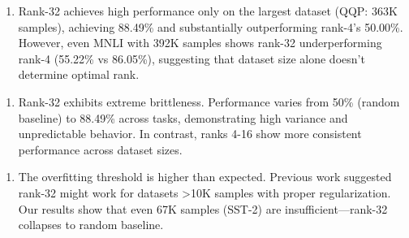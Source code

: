 \begin{enumerate}
\item Rank-32 achieves high performance only on the largest dataset (QQP: 363K samples), achieving 88.49\% and substantially outperforming rank-4's 50.00\%. However, even MNLI with 392K samples shows rank-32 underperforming rank-4 (55.22\% vs 86.05\%), suggesting that dataset size alone doesn't determine optimal rank.
\end{enumerate}

\begin{enumerate}
\item Rank-32 exhibits extreme brittleness. Performance varies from 50\% (random baseline) to 88.49\% across tasks, demonstrating high variance and unpredictable behavior. In contrast, ranks 4-16 show more consistent performance across dataset sizes.
\end{enumerate}

\begin{enumerate}
\item The overfitting threshold is higher than expected. Previous work suggested rank-32 might work for datasets >10K samples with proper regularization. Our results show that even 67K samples (SST-2) are insufficient—rank-32 collapses to random baseline.
\end{enumerate}
